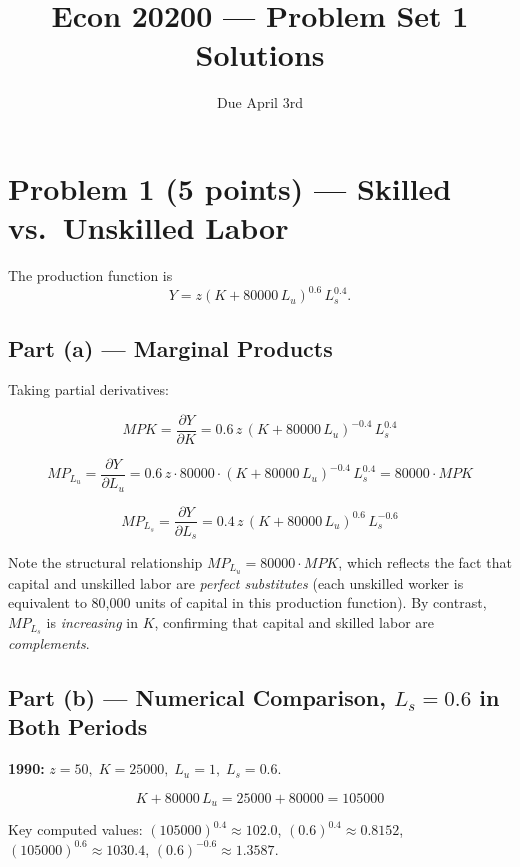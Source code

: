 \documentclass[12pt]{article}
\title{Econ 20200 --- Problem Set 1 Solutions}
\date{Due April 3rd}
\begin{document}
\maketitle

\section*{Problem 1 (5 points) --- Skilled vs.\ Unskilled Labor}

The production function is
\[
    Y = z(K + 80000\,L_u)^{0.6}\,L_s^{0.4}.
\]

\subsection*{Part (a) --- Marginal Products}

Taking partial derivatives:

\[
    MPK
        = \frac{\partial Y}{\partial K}
        = 0.6\,z\,(K+80000\,L_u)^{-0.4}\,L_s^{0.4}
\]

\[
    MP_{L_u}
        = \frac{\partial Y}{\partial L_u}
        = 0.6\,z\cdot 80000\cdot(K+80000\,L_u)^{-0.4}\,L_s^{0.4}
        = 80000 \cdot MPK
\]

\[
    MP_{L_s}
        = \frac{\partial Y}{\partial L_s}
        = 0.4\,z\,(K+80000\,L_u)^{0.6}\,L_s^{-0.6}
\]

Note the structural relationship $MP_{L_u} = 80000 \cdot MPK$, which reflects
the fact that capital and unskilled labor are \emph{perfect substitutes}
(each unskilled worker is equivalent to 80{,}000 units of capital in this
production function). By contrast, $MP_{L_s}$ is \emph{increasing} in $K$,
confirming that capital and skilled labor are \emph{complements}.

\subsection*{Part (b) --- Numerical Comparison, $L_s = 0.6$ in Both Periods}

\textbf{1990:} $z=50,\; K=25000,\; L_u=1,\; L_s=0.6$.

\[
    K + 80000\,L_u = 25000 + 80000 = 105000
\]

Key computed values:
$(105000)^{0.4} \approx 102.0$,\;
$(0.6)^{0.4} \approx 0.8152$,\;
$(105000)^{0.6} \approx 1030.4$,\;
$(0.6)^{-0.6} \approx 1.3587$.
\end{document}
